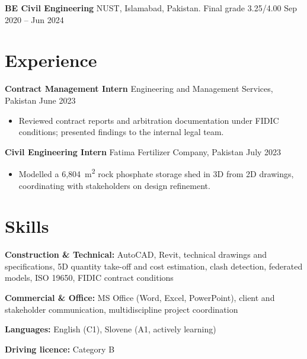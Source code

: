 \documentclass[a4paper,10.5pt]{article}
\newcommand{\datefill}{\dotfill}
\newcommand{\entry}[3]{\vspace{2.5pt}\noindent\textbf{#1} \textbar{} #2 \datefill{} #3\par\vspace{0.5pt}}
\newcommand{\skillrow}[2]{\noindent\textbf{#1:} #2\par\vspace{1pt}}
\begin{document}
\entry{BE Civil Engineering}{NUST, Islamabad, Pakistan. Final grade 3.25/4.00}{Sep 2020 -- Jun 2024}

\section{Experience}
\entry{Contract Management Intern}{Engineering and Management Services, Pakistan}{June 2023}
\begin{itemize}
  \item Reviewed contract reports and arbitration documentation under FIDIC
        conditions; presented findings to the internal legal team.
\end{itemize}

\entry{Civil Engineering Intern}{Fatima Fertilizer Company, Pakistan}{July 2023}
\begin{itemize}
  \item Modelled a 6,804~m\textsuperscript{2} rock phosphate storage shed in 3D from
        2D drawings, coordinating with stakeholders on design refinement.
\end{itemize}

\section{Skills}

\skillrow{Construction \& Technical}{AutoCAD, Revit, technical drawings and specifications, 5D quantity take-off and cost estimation, clash detection, federated models, ISO 19650, FIDIC contract conditions}
\skillrow{Commercial \& Office}{MS Office (Word, Excel, PowerPoint), client and stakeholder communication, multidiscipline project coordination}

\skillrow{Languages}{English (C1), Slovene (A1, actively learning)}
\skillrow{Driving licence}{Category B}
\end{document}

